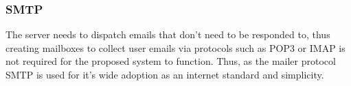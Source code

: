 \subsubsection{SMTP}
The server needs to dispatch emails that don't need to be responded to, thus creating mailboxes to collect user emails via protocols such as POP3 or IMAP is not required for the proposed system to function.
Thus, as the mailer protocol SMTP\cite{ietfsmtp} is used for it's wide adoption as an internet standard and simplicity.



